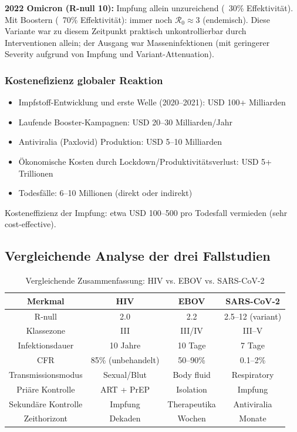 ﻿\documentclass[a4paper,12pt,twoside]{article}
\theoremstyle{definition}
\begin{document}
\textbf{2022 Omicron (R-null 10):} Impfung allein unzureichend (~30\% Effektivität). Mit Boostern (~70\% Effektivität): immer noch $\mathcal{R}_0 \approx 3$ (endemisch). Diese Variante war zu diesem Zeitpunkt praktisch unkontrollierbar durch Interventionen allein; der Ausgang war Masseninfektionen (mit geringerer Severity aufgrund von Impfung und Variant-Attenuation).

\subsubsection{Kostenefizienz globaler Reaktion}

\begin{itemize}
\item Impfstoff-Entwicklung und erste Welle (2020--2021): USD 100+ Milliarden
\item Laufende Booster-Kampagnen: USD 20--30 Milliarden/Jahr
\item Antiviralia (Paxlovid) Produktion: USD 5--10 Milliarden
\item Ökonomische Kosten durch Lockdown/Produktivitätsverlust: USD 5+ Trillionen
\item Todesfälle: 6--10 Millionen (direkt oder indirekt)
\end{itemize}

Kosteneffizienz der Impfung: etwa USD 100--500 pro Todesfall vermieden (sehr cost-effective).

\subsection{Vergleichende Analyse der drei Fallstudien}

\begin{table}[h!]
\centering
\caption{Vergleichende Zusammenfassung: HIV vs. EBOV vs. SARS-CoV-2}
\begin{tabular}{|c|c|c|c|}
\hline
\textbf{Merkmal} & \textbf{HIV} & \textbf{EBOV} & \textbf{SARS-CoV-2} \\
\hline
R-null & 2.0 & 2.2 & 2.5--12 (variant) \\
Klassezone & III & III/IV & III--V \\
Infektionsdauer & 10 Jahre & 10 Tage & 7 Tage \\
CFR & 85\% (unbehandelt) & 50--90\% & 0.1--2\% \\
Transmissionsmodus & Sexual/Blut & Body fluid & Respiratory \\
Priäre Kontrolle & ART + PrEP & Isolation & Impfung \\
Sekundäre Kontrolle & Impfung & Therapeutika & Antiviralia \\
Zeithorizont & Dekaden & Wochen & Monate \\
\hline
\end{tabular}
\end{table}
\end{document}
